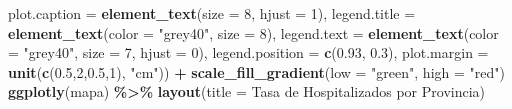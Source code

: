 \documentclass[
]{book}
\newenvironment{Shaded}{\begin{snugshade}}{\end{snugshade}}
\newcommand{\DataTypeTok}[1]{\textcolor[rgb]{0.13,0.29,0.53}{#1}}
\newcommand{\DecValTok}[1]{\textcolor[rgb]{0.00,0.00,0.81}{#1}}
\newcommand{\FloatTok}[1]{\textcolor[rgb]{0.00,0.00,0.81}{#1}}
\newcommand{\KeywordTok}[1]{\textcolor[rgb]{0.13,0.29,0.53}{\textbf{#1}}}
\newcommand{\NormalTok}[1]{#1}
\newcommand{\OperatorTok}[1]{\textcolor[rgb]{0.81,0.36,0.00}{\textbf{#1}}}
\newcommand{\StringTok}[1]{\textcolor[rgb]{0.31,0.60,0.02}{#1}}
\begin{document}
\begin{Shaded}
\begin{Highlighting}[]
    \DataTypeTok{plot.caption =} \KeywordTok{element\_text}\NormalTok{(}\DataTypeTok{size =} \DecValTok{8}\NormalTok{, }\DataTypeTok{hjust =} \DecValTok{1}\NormalTok{),}
    \DataTypeTok{legend.title =} \KeywordTok{element\_text}\NormalTok{(}\DataTypeTok{color =} \StringTok{"grey40"}\NormalTok{, }\DataTypeTok{size =} \DecValTok{8}\NormalTok{),}
    \DataTypeTok{legend.text =} \KeywordTok{element\_text}\NormalTok{(}\DataTypeTok{color =} \StringTok{"grey40"}\NormalTok{, }\DataTypeTok{size =} \DecValTok{7}\NormalTok{, }\DataTypeTok{hjust =} \DecValTok{0}\NormalTok{),}
    \DataTypeTok{legend.position =} \KeywordTok{c}\NormalTok{(}\FloatTok{0.93}\NormalTok{, }\FloatTok{0.3}\NormalTok{),}
    \DataTypeTok{plot.margin =} \KeywordTok{unit}\NormalTok{(}\KeywordTok{c}\NormalTok{(}\FloatTok{0.5}\NormalTok{,}\DecValTok{2}\NormalTok{,}\FloatTok{0.5}\NormalTok{,}\DecValTok{1}\NormalTok{), }\StringTok{"cm"}\NormalTok{)) }\OperatorTok{+}
\StringTok{  }\KeywordTok{scale\_fill\_gradient}\NormalTok{(}\DataTypeTok{low =} \StringTok{"green"}\NormalTok{, }\DataTypeTok{high =} \StringTok{"red"}\NormalTok{)}
\KeywordTok{ggplotly}\NormalTok{(mapa) }\OperatorTok{\%\textgreater{}\%}\StringTok{  }
\StringTok{  }\KeywordTok{layout}\NormalTok{(}\DataTypeTok{title =} \StringTok{\textquotesingle{}Tasa de Hospitalizados por Provincia\textquotesingle{}}\NormalTok{)}
\end{Highlighting}
\end{Shaded}

\hypertarget{htmlwidget-1908f753aaf894b37f1e}{}
\end{document}
